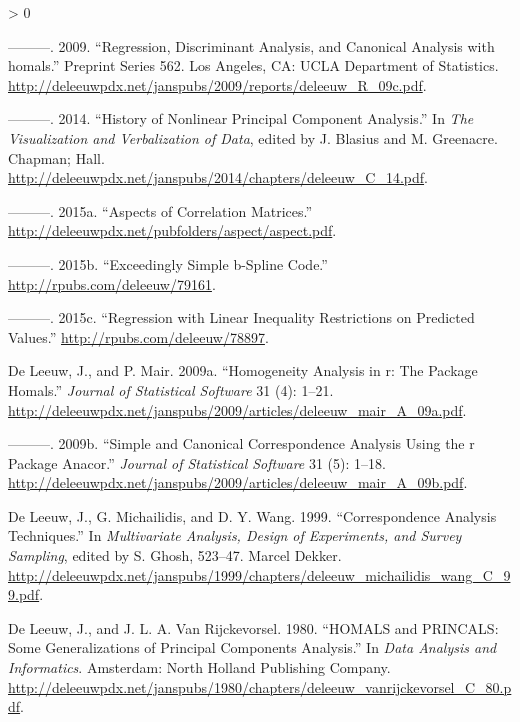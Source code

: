 \documentclass[
  12pt,
]{book}
\newlength{\cslhangindent}
\newenvironment{CSLReferences}[2] %
 {%
  \setlength{\parindent}{0pt}
  \ifodd #1 \everypar{\setlength{\hangindent}{\cslhangindent}}\ignorespaces\fi
  \ifnum #2 > 0
  \setlength{\parskip}{#2\baselineskip}
  \fi
 }%
 {}
\begin{document}
\begin{CSLReferences}{1}{0}
\leavevmode\hypertarget{ref-deleeuw_R_09c}{}%
---------. 2009. {``{Regression, Discriminant Analysis, and Canonical Analysis with homals}.''} Preprint Series 562. Los Angeles, CA: UCLA Department of Statistics. \url{http://deleeuwpdx.net/janspubs/2009/reports/deleeuw_R_09c.pdf}.

\leavevmode\hypertarget{ref-deleeuw_C_14}{}%
---------. 2014. {``{History of Nonlinear Principal Component Analysis}.''} In \emph{{The Visualization and Verbalization of Data}}, edited by J. Blasius and M. Greenacre. Chapman; Hall. \url{http://deleeuwpdx.net/janspubs/2014/chapters/deleeuw_C_14.pdf}.

\leavevmode\hypertarget{ref-deleeuw_E_15b}{}%
---------. 2015a. {``{Aspects of Correlation Matrices}.''} \url{http://deleeuwpdx.net/pubfolders/aspect/aspect.pdf}.

\leavevmode\hypertarget{ref-deleeuw_E_15d}{}%
---------. 2015b. {``Exceedingly Simple b-Spline Code.''} \url{http://rpubs.com/deleeuw/79161}.

\leavevmode\hypertarget{ref-deleeuw_E_15e}{}%
---------. 2015c. {``Regression with Linear Inequality Restrictions on Predicted Values.''} \url{http://rpubs.com/deleeuw/78897}.

\leavevmode\hypertarget{ref-deleeuw_mair_A_09a}{}%
De Leeuw, J., and P. Mair. 2009a. {``Homogeneity Analysis in r: The Package Homals.''} \emph{Journal of Statistical Software} 31 (4): 1--21. \url{http://deleeuwpdx.net/janspubs/2009/articles/deleeuw_mair_A_09a.pdf}.

\leavevmode\hypertarget{ref-deleeuw_mair_A_09b}{}%
---------. 2009b. {``Simple and Canonical Correspondence Analysis Using the r Package Anacor.''} \emph{Journal of Statistical Software} 31 (5): 1--18. \url{http://deleeuwpdx.net/janspubs/2009/articles/deleeuw_mair_A_09b.pdf}.

\leavevmode\hypertarget{ref-deleeuw_michailidis_wang_C_99}{}%
De Leeuw, J., G. Michailidis, and D. Y. Wang. 1999. {``Correspondence Analysis Techniques.''} In \emph{Multivariate Analysis, Design of Experiments, and Survey Sampling}, edited by S. Ghosh, 523--47. Marcel Dekker. \url{http://deleeuwpdx.net/janspubs/1999/chapters/deleeuw_michailidis_wang_C_99.pdf}.

\leavevmode\hypertarget{ref-deleeuw_vanrijckevorsel_C_80}{}%
De Leeuw, J., and J. L. A. Van Rijckevorsel. 1980. {``HOMALS and PRINCALS: Some Generalizations of Principal Components Analysis.''} In \emph{Data Analysis and Informatics}. Amsterdam: North Holland Publishing Company. \url{http://deleeuwpdx.net/janspubs/1980/chapters/deleeuw_vanrijckevorsel_C_80.pdf}.


\end{CSLReferences}
\end{document}
